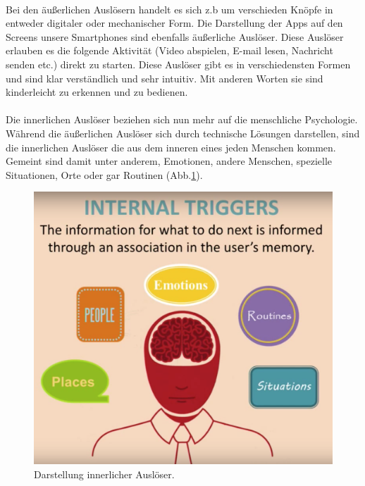 \documentclass[a4paper,12pt]{scrartcl}
\begin{document}
\\
Bei den äußerlichen Auslösern handelt es sich z.b um verschieden Knöpfe in entweder digitaler oder mechanischer Form. Die Darstellung der Apps auf den Screens unsere Smartphones sind ebenfalls äußerliche Auslöser. Diese Auslöser erlauben es die folgende Aktivität (Video abspielen, E-mail lesen, Nachricht senden etc.) direkt zu starten. Diese Auslöser gibt es in verschiedensten Formen und sind klar verständlich und sehr intuitiv. Mit anderen Worten sie sind kinderleicht zu erkennen und zu bedienen\cite{Eyal2014}.
\\\\
Die innerlichen Auslöser beziehen sich nun mehr auf die menschliche Psychologie. Während die äußerlichen Auslöser sich durch technische Lösungen darstellen, sind die innerlichen Auslöser die aus dem inneren eines jeden Menschen kommen. Gemeint sind damit unter anderem, Emotionen, andere Menschen, spezielle Situationen, Orte oder gar Routinen (Abb.\ref{internalTriggerBild}).
\\
\begin{figure}[h!]
\begin{center}
\includegraphics[scale = 0.3]{Bilder/internalTrigger.eps}
\caption{Darstellung innerlicher Auslöser\cite{ExternalTrigger2018}.}
\label{internalTriggerBild}
\end{center}
\end{figure} 
\\
\end{document}

